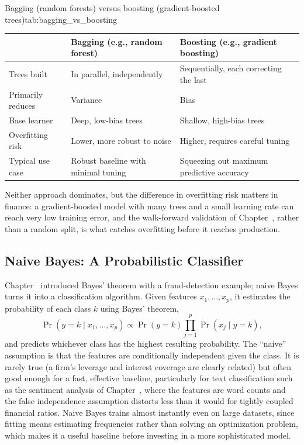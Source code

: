 \documentclass[../ai_in_finance]{subfiles}
\begin{document}
\begin{booktable}[htbp]{Bagging (random forests) versus boosting (gradient-boosted trees)}{tab:bagging_vs_boosting}
\begin{tabular}{L{2.8cm}L{5.0cm}L{5.0cm}}
\toprule
 & Bagging (e.g., random forest) & Boosting (e.g., gradient boosting) \\
\midrule
Trees built & In parallel, independently & Sequentially, each correcting the last \\
Primarily reduces & Variance & Bias \\
Base learner & Deep, low-bias trees & Shallow, high-bias trees \\
Overfitting risk & Lower, more robust to noise & Higher, requires careful tuning \\
Typical use case & Robust baseline with minimal tuning & Squeezing out maximum predictive accuracy \\
\bottomrule
\end{tabular}
\end{booktable}

Neither approach dominates, but the difference in overfitting risk matters in finance: a gradient-boosted model with many trees and a small learning rate can reach very low training error, and the walk-forward validation of Chapter~, rather than a random split, is what catches overfitting before it reaches production.

\subsection{Naive Bayes: A Probabilistic Classifier}

Chapter~ introduced Bayes' theorem with a fraud-detection example; naive Bayes turns it into a classification algorithm. Given features $x_1, \ldots, x_p$, it estimates the probability of each class $k$ using Bayes' theorem,
\begin{equation*}
\Pr(y=k \mid x_1, \ldots, x_p) \propto \Pr(y=k) \prod_{j=1}^p \Pr(x_j \mid y=k),
\end{equation*}
and predicts whichever class has the highest resulting probability. The ``naive'' assumption is that the features are conditionally independent given the class. It is rarely true (a firm's leverage and interest coverage are clearly related) but often good enough for a fast, effective baseline, particularly for text classification such as the sentiment analysis of Chapter~, where the features are word counts and the false independence assumption distorts less than it would for tightly coupled financial ratios. Naive Bayes trains almost instantly even on large datasets, since fitting means estimating frequencies rather than solving an optimization problem, which makes it a useful baseline before investing in a more sophisticated model.
\end{document}

